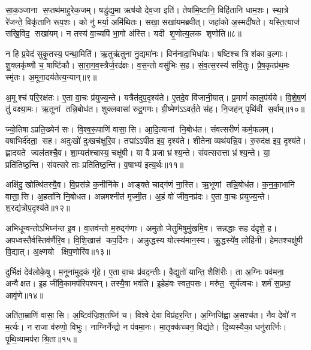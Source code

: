 सा॒क॒ञ्जाना स॒प्तथ॑माहुरेक॒जम्‌। षडु॑द्य॒मा ऋष॑यो देव॒जा इति॑। 
तेषा॑मि॒ष्टानि॒ विहि॑तानि धाम॒शः। स्था॒त्रे रे॑जन्ते॒ विकृ॑तानि रूप॒शः। 
को नु॑ मर्या॒ अमि॑थितः। सखा॒ सखा॑यमब्रवीत्‌। 
जहा॑को अ॒स्मदी॑षते। यस्ति॒त्याज॑ सखि॒विद॒ सखा॑यम्‌। 
न तस्य॑ वा॒च्यपि॑ भा॒गो अ॑स्ति। यदी शृ॒णोत्य॒लक शृणोति॥८॥

न हि प्र॒वेद॑ सुकृ॒तस्य॒ पन्था॒मिति॑। ऋ॒तु\ur{}ऋ॑तुना नु॒द्यमा॑नः। 
विन॑नादा॒भिधा॑वः। षष्टिश्च त्रिश॑का व॒ल्गाः। 
शु॒क्लकृ॑ष्णौ च॒ षाष्टि॑कौ। सा॒रा॒ग॒व॒स्त्रैर्ज॒रद॑क्षः। 
व॒स॒न्तो वसु॑भिः स॒ह। सं॒व॒त्स॒रस्य॑ सवि॒तुः। 
प्रै॒ष॒कृत्प्र॑थ॒मः स्मृ॑तः। अ॒मूना॒दय॑तेत्य॒न्यान्‌॥९॥

अ॒मूश्च॑ परि॒रक्ष॑तः। ए॒ता वा॒चः प्र॑युज्य॒न्ते। 
यत्रैत॑दुप॒दृश्य॑ते। ए॒तदे॒व वि॑जानी॒यात्। 
प्र॒माणं॑ काल॒प॑र्यये। वि॒शे॒ष॒णं तु॑ वक्ष्या॒मः। 
ऋ॒तूनां तन्नि॒बोध॑त। शुक्लवासा॑ रुद्र॒गणः। 
ग्री॒ष्मेण॑ऽऽवर्त॒ते स॑ह। नि॒जह॑न्‌ पृथि॑वी स॒र्वाम्‌॥१०॥

ज्यो॒तिषाऽप्रति॒ख्येन॑ सः। वि॒श्व॒रू॒पाणि॑ वासा॒सि। 
आ॒दि॒त्यानां नि॒बोध॑त। संवत्सरीणं॑ कर्म॒फलम्‌। 
व\ur{}षाभिर्द॑दता॒ सह। अदुःखो॑ दुःखच॑क्षुरि॒व। 
तद्मा॑ऽऽपीत इव॒ दृश्य॑ते। शीतेनाव्यथ॑यन्नि॒व। 
रु॒रुद॑क्ष इव॒ दृश्य॑ते। ह्लादयते ज्वल॑तश्चै॒व। 
शा॒म्यत॑श्चास्य॒ चक्षु॑षी। या वै प्रजा भ्र॑श्य॒न्ते। 
संवत्सरात्ता भ्र॑श्य॒न्ते। या॒ प्रति॑तिष्ठ॒न्ति। 
संवत्सरे ताः प्रति॑तिष्ठ॒न्ति। व॒\ar{}षाभ्य॑ इत्य॒र्थः॥११॥\anuvakamend


अक्षि॑दु॒खोत्थि॑तस्यै॒व। वि॒प्रस॑न्ने क॒नीनि॑के। 
आङ्क्ते चाद्ग॑णं ना॒स्ति। ऋ॒भूणां तन्नि॒बोध॑त। 
क॒न॒का॒भानि॑ वासा॒सि। अ॒हता॑नि नि॒बोधत। 
अन्नमश्नीत॑ मृज्मी॒त। अ॒हं वो॑ जीव॒नप्र॑दः। 
ए॒ता वा॒चः प्र॑युज्य॒न्ते। श॒रद्य॑त्रोप॒दृश्य॑ते॥१२॥

अभिधून्वन्तोऽभिघ्न॑न्त इ॒व। वा॒तव॑न्तो म॒रुद्ग॑णाः। 
अमुतो जेतुमिषुमु॑खमि॒व। सन्नद्धाः सह द॑दृशे॒ ह। 
अपध्वस्तैर्वस्तिव॑र्णैरि॒व। वि॒शि॒खास॑ कप॒र्दिनः। 
अक्रुद्धस्य योत्स्य॑मान॒स्य। क्रु॒द्धस्ये॑व॒ लोहि॑नी। 
हेमतश्चक्षु॑षी वि॒द्यात्‌। अ॒क्ष्णयो क्षिप॒णोरि॑व॥१३॥

दुर्भिक्षं देव॑लोके॒षु। म॒नूना॑मुद॒कं गृ॑हे। 
ए॒ता वा॒चः प्र॑वद॒न्तीः। वै॒द्युतो॑ यान्ति॒ शैशि॑रीः। 
ता अ॒ग्निः पव॑मना॒ अन्वैक्षत। इ॒ह जी॑वि॒कामप॑रिपश्यन्‌। 
तस्यै॒षा भव॑ति। इ॒हेह॑वः स्वत॒पसः। 
मरु॑त॒ सूर्य॑त्वचः। शर्म॑ स॒प्रथा॒ आवृ॑णे॥१४॥\anuvakamend


अति॑ता॒म्राणि॑ वासा॒सि। अ॒ष्टिव॑ज्रिश॒तघ्नि॑ च। 
विश्वे देवा विप्र॑हर॒न्ति। अ॒ग्निजि॑ह्वा अ॒सश्च॑त। 
नैव देवो॑ न म॒र्त्यः। न राजा व॑रुणो॒ विभुः। 
नाग्निर्नेन्द्रो न प॑वमा॒नः। मा॒तृक्क॑च्चन॒ विद्य॑ते। 
दि॒व्यस्यैका॒ धनु॑रार्त्निः। पृ॒थि॒व्यामप॑रा श्रि॒ता॥१५॥

